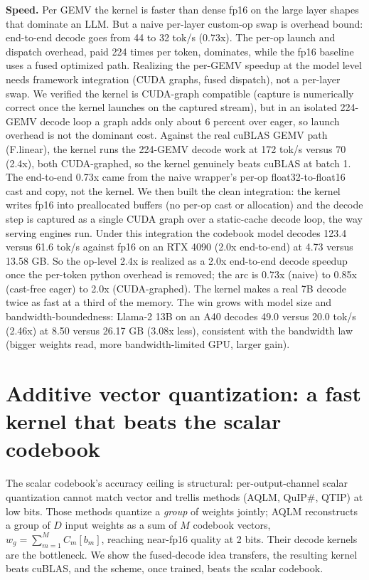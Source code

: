 \documentclass[11pt]{article}
\begin{document}
\textbf{Speed.} Per GEMV the kernel is faster than dense fp16 on the large layer
shapes that dominate an LLM. But a naive per-layer custom-op swap is overhead bound:
end-to-end decode goes from 44 to 32 tok/s (0.73x). The per-op launch and dispatch
overhead, paid 224 times per token, dominates, while the fp16 baseline uses a fused
optimized path. Realizing the per-GEMV speedup at the model level needs framework
integration (CUDA graphs, fused dispatch), not a per-layer swap. We verified the
kernel is CUDA-graph compatible (capture is numerically correct once the kernel
launches on the captured stream), but in an isolated 224-GEMV decode loop a graph
adds only about 6 percent over eager, so launch overhead is not the dominant cost.
Against the real cuBLAS GEMV path (F.linear), the kernel runs the 224-GEMV decode
work at 172 tok/s versus 70 (2.4x), both CUDA-graphed, so the kernel genuinely beats
cuBLAS at batch 1. The end-to-end 0.73x came from the naive wrapper's per-op
float32-to-float16 cast and copy, not the kernel. We then built the clean integration:
the kernel writes fp16 into preallocated buffers (no per-op cast or allocation) and the
decode step is captured as a single CUDA graph over a static-cache decode loop, the way
serving engines run. Under this integration the codebook model decodes 123.4 versus
61.6 tok/s against fp16 on an RTX 4090 (2.0x end-to-end) at 4.73 versus 13.58 GB. So the
op-level 2.4x is realized as a 2.0x end-to-end decode speedup once the per-token python
overhead is removed; the arc is 0.73x (naive) to 0.85x (cast-free eager) to 2.0x
(CUDA-graphed). The kernel makes a real 7B decode twice as fast at a third of the
memory. The win grows with model size and bandwidth-boundedness: Llama-2 13B on an A40
decodes 49.0 versus 20.0 tok/s (2.46x) at 8.50 versus 26.17 GB (3.08x less), consistent
with the bandwidth law (bigger weights read, more bandwidth-limited GPU, larger gain).

\section{Additive vector quantization: a fast kernel that beats the scalar codebook}

The scalar codebook's accuracy ceiling is structural: per-output-channel scalar
quantization cannot match vector and trellis methods (AQLM, QuIP\#, QTIP) at low bits.
Those methods quantize a \emph{group} of weights jointly; AQLM reconstructs a group of
$D$ input weights as a sum of $M$ codebook vectors, $w_g = \sum_{m=1}^{M} C_m[b_m]$,
reaching near-fp16 quality at 2 bits. Their decode kernels are the bottleneck. We show the
fused-decode idea transfers, the resulting kernel beats cuBLAS, and the scheme, once
trained, beats the scalar codebook.
\end{document}
